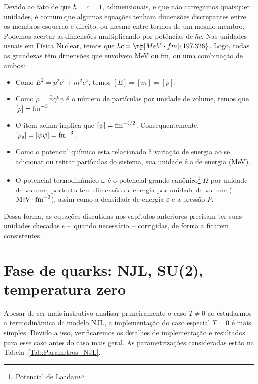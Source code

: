 Devido ao fato de que $\hbar = c = 1$, adimensionais, e que não carregamos quaisquer unidades, é comum que algumas equações tenham dimensões discrepantes entre os membros esquerdo e direito, ou mesmo entre termos de um mesmo membro. Podemos acertar as dimensões multiplicando por potências de $\hbar c$. Nas unidades usuais em Física Nuclear, temos que $\hbar c = \np[MeV\cdot fm]{197.326}$. Logo, todas as grandezas têm dimensões que envolvem MeV ou fm, ou uma combinação de ambos:

\begin{itemize}
	\item Como $E^2 = p^2c^2 + m^2c^4$, temos $[E] = [m] = [p]$;
	\item Como $\rho = \bar{\psi}\gamma^0\psi$ é o número de partículas por unidade de volume, temos que $[\rho] = \rm{fm}^{-3}$
	\item O item acima implica que $[\psi] = \rm{fm}^{-3/2}$. Consequentemente, $[\rho_s] = [\bar{\psi}\psi] = \rm{fm}^{-3}$. 
	\item Como o potencial químico esta relacionado à variação de energia ao se adicionar ou retirar partículas do sistema, sua unidade é a de energia (MeV).
	\item O potencial termodinâmico $\omega$ é o potencial grande-canônico\footnote{Potencial de Landau} $\Omega$ por unidade de volume, portanto tem dimensão de energia por unidade de volume ($\rm{MeV}\cdot\rm{fm}^{-3}$), assim como a densidade de energia $\varepsilon$ e a pressão $P$.
\end{itemize}
%
Dessa forma, as equações discutidas nos capítulos anteriores precisam ter suas unidades checadas e --~quando necessário~-- corrigidas, de forma a ficarem consistentes.

\section{Fase de quarks: NJL, SU(2), temperatura zero}

Apesar de ser mais instrutivo analisar primeiramente o caso $T \neq 0$ ao estudarmos a termodinâmica do modelo NJL, a implementação do caso especial $T = 0$ é mais simples. Devido a isso, verificaremos os detalhes de implementação e resultados para esse caso antes do caso mais geral. As parametrizações consideradas estão na Tabela~\ref{Tab:Parametros_NJL}.

